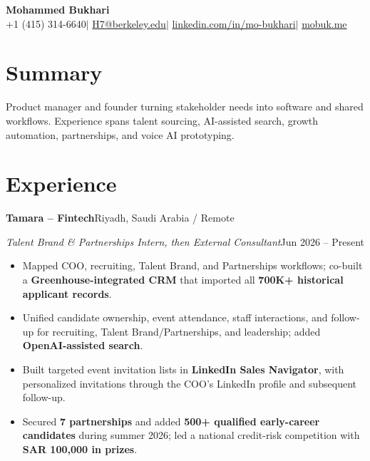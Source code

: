 \documentclass[a4paper,10pt]{article}
\newcommand{\entry}[4]{%
  \textbf{#1}\hfill #2\par
  \textit{#3}\hfill #4\par
}
\begin{document}
\begin{center}
  {\LARGE\bfseries Mohammed Bukhari}\\[3pt]
  +1 (415) 314-6640\enspace$|$\enspace
  \href{mailto:H7@berkeley.edu}{H7@berkeley.edu}\enspace$|$\enspace
  \href{https://www.linkedin.com/in/mo-bukhari/}{linkedin.com/in/mo-bukhari}\enspace$|$\enspace
  \href{https://mobuk.me}{mobuk.me}
\end{center}
\vspace{-5pt}

\section{Summary}
Product manager and founder turning stakeholder needs into software and shared workflows. Experience spans talent sourcing, AI-assisted search, growth automation, partnerships, and voice AI prototyping.

\section{Experience}
\entry{Tamara -- Fintech}{Riyadh, Saudi Arabia / Remote}
{Talent Brand \& Partnerships Intern, then External Consultant}{Jun 2026 -- Present}
\begin{itemize}
  \item Mapped COO, recruiting, Talent Brand, and Partnerships workflows; co-built a \textbf{Greenhouse-integrated CRM} that imported all \textbf{700K+ historical applicant records}.
  \item Unified candidate ownership, event attendance, staff interactions, and follow-up for recruiting, Talent Brand/Partnerships, and leadership; added \textbf{OpenAI-assisted search}.
  \item Built targeted event invitation lists in \textbf{LinkedIn Sales Navigator}, with personalized invitations through the COO's LinkedIn profile and subsequent follow-up.
  \item Secured \textbf{7 partnerships} and added \textbf{500+ qualified early-career candidates} during summer 2026; led a national credit-risk competition with \textbf{SAR 100,000 in prizes}.
\end{itemize}
\end{document}
